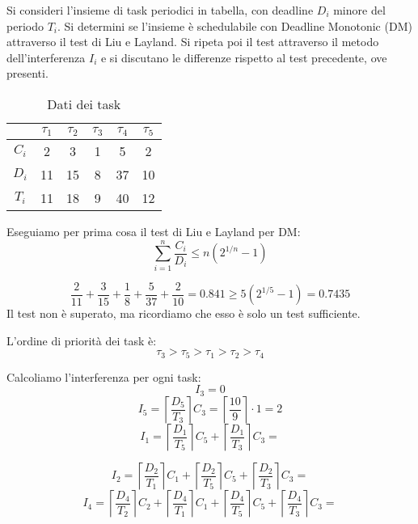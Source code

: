\begin{Esercizio8}







\end{Esercizio8}

\begin{Esercizio9}

  

Si consideri l'insieme di task periodici in tabella, 
con deadline $D_i$ minore del periodo $T_i$. 
Si determini se l'insieme è schedulabile con 
Deadline Monotonic (DM) attraverso il test di Liu e Layland. 
Si ripeta poi il test attraverso il metodo dell'interferenza $I_i$ e 
si discutano le differenze rispetto al test precedente, ove presenti.

\begin{table}[H]
\centering
\caption{Dati dei task}
\begin{tabular}{|c|c|c|c|c|c|}
\hline
 & $\tau_1$ & $\tau_2$ & $\tau_3$ & $\tau_4$ & $\tau_5$ \\
\hline
$C_i$ & 2 & 3 & 1 & 5 & 2 \\
\hline
$D_i$ & 11 & 15 & 8 & 37 & 10 \\
\hline
$T_i$ & 11 & 18 & 9 & 40 & 12 \\
\hline
\end{tabular}
\label{tab:dm_tasks}
\end{table}


Eseguiamo per prima cosa il test di Liu e Layland per DM:
\[
\sum_{i=1}^{n} \frac{C_{i}}{D_{i}} \le n (2^{1/n} - 1)
\]

\[\frac{2}{11} + \frac{3}{15} + \frac{1}{8} + \frac{5}{37} + \frac{2}{10} 
= 0.841
\ge 5 (2^{1/5} - 1) = 0.7435\]
Il test non è superato, ma ricordiamo che esso è solo un test sufficiente.



L'ordine di priorità dei task è:
\[
\tau_{3} > \tau_{5} > \tau_{1} > \tau_{2} > \tau_{4}
\]



Calcoliamo l'interferenza per ogni task:
\[ I_{3} = 0 \]
\[ I_{5} = \left \lceil \frac{D_{5}}{T_{3}} \right \rceil C_{3} = \left \lceil \frac{10}{9} \right \rceil  \cdot 1 = 2 \]
\[I_{1} = \left \lceil \frac{D_{1}}{T_{5}} \right \rceil C_{5}  + \left \lceil \frac{D_{1}}{T_{3}} \right \rceil C_{3}
=    \]

\[I_{2} = \left \lceil \frac{D_{2}}{T_{1}} \right \rceil C_{1} + \left \lceil \frac{D_{2}}{T_{5}} \right \rceil C_{5} 
 + \left \lceil \frac{D_{2}}{T_{3}} \right \rceil C_{3}
=   \]
\[I_{4} = \left \lceil \frac{D_{4}}{T_{2}} \right \rceil C_{2}  + 
\left \lceil \frac{D_{4}}{T_{1}} \right \rceil C_{1} + \left \lceil \frac{D_{4}}{T_{5}} \right \rceil C_{5} 
 + \left \lceil \frac{D_{4}}{T_{3}} \right \rceil C_{3}
=   \]


\end{Esercizio9}